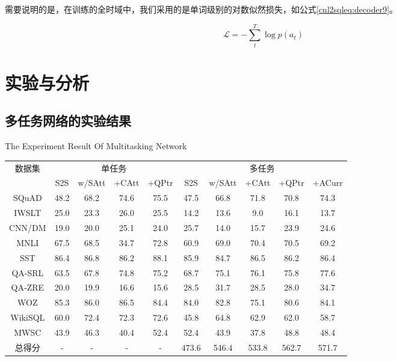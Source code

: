 需要说明的是，在训练的全时域中，我们采用的是单词级别的对数似然损失，如公式\ref{cnl2sqleq:decoder9}。

\begin{equation}
  \label{cnl2sqleq:decoder9}
  \mathcal L = -\sum^T_t \log p(a_t)
\end{equation}


\section{实验与分析}
\label{cnl2sql:syyfx}
\subsection{多任务网络的实验结果}

\begin{table}[!htpb]
    {The Experiment Result Of Multitasking Network}
  \label{tab:drwwldsyjg}
  \centering
  \begin{threeparttable}[b]
     \begin{tabular}{cccccccccc}
      \toprule
      \multirow{2}{18mm}{数据集}&\multicolumn{4}{c}{单任务} & \multicolumn{5}{c}{多任务}\\
      \cmidrule(lr){2-5}\cmidrule(lr){6-10}
      & S2S & w/SAtt & +CAtt & +QPtr & S2S & w/SAtt & +CAtt & +QPtr & +ACurr\\
      \midrule
      SQuAD & 48.2 & 68.2 & 74.6 & 75.5 & 47.5 & 66.8 & 71.8 & 70.8 & 74.3\\
      IWSLT & 25.0 & 23.3 & 26.0 & 25.5 & 14.2 & 13.6 & 9.0 & 16.1 & 13.7\\
      CNN/DM & 19.0 & 20.0 & 25.1 & 24.0 & 25.7 & 14.0 & 15.7 & 23.9 & 24.6\\
      MNLI & 67.5 & 68.5 & 34.7 & 72.8 & 60.9 & 69.0 & 70.4 & 70.5 & 69.2\\
      SST & 86.4 & 86.8 & 86.2 & 88.1 & 85.9 & 84.7 & 86.5 & 86.2 & 86.4\\
      QA-SRL & 63.5 & 67.8 & 74.8 & 75.2 & 68.7 & 75.1 & 76.1 & 75.8 & 77.6\\
      QA-ZRE & 20.0 & 19.9 & 16.6 & 15.6 & 28.5 & 31.7 & 28.5 & 28.0 & 34.7\\
      WOZ & 85.3 & 86.0 & 86.5 & 84.4 & 84.0 & 82.8 & 75.1 & 80.6 & 84.1\\
      WikiSQL & 60.0 & 72.4 & 72.3 & 72.6 & 45.8 & 64.8 & 62.9 & 62.0 & 58.7\\
      MWSC & 43.9 & 46.3 & 40.4 & 52.4 & 52.4 & 43.9 & 37.8 & 48.8 & 48.4\\
      \midrule
      总得分 & - & - & - & - & 473.6 & 546.4 & 533.8 & 562.7 & 571.7\\
      \bottomrule
    \end{tabular}
  \end{threeparttable}
\end{table}

